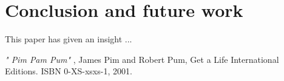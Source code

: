 \documentclass[english,a4]{article}
\begin{document}
\section{Conclusion and future work}
\label{N400026}\hypertarget{N400026}{}%

This paper has given an insight ... 
%	
%	

\begin{thebibliography}{WIDELABEL}

\emph{" Pim Pam Pum"} , James Pim and Robert Pum, Get a Life International Editions. ISBN 0-XS-xsxs-1, 2001. \label{PimPum}


\end{thebibliography}

\end{document}
